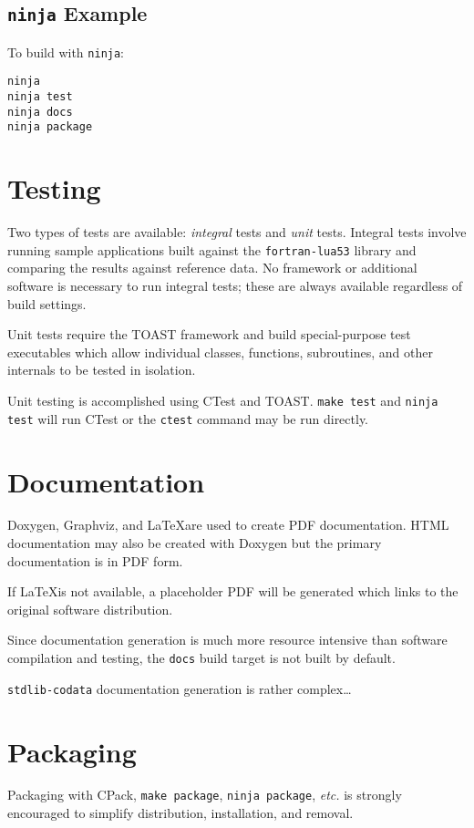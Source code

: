 \subsection{\texttt{ninja} Example}

To build with \texttt{ninja}:

\begin{Verbatim}
ninja
ninja test
ninja docs
ninja package
\end{Verbatim}

\section{Testing}

Two types of tests are available: \emph{integral} tests and \emph{unit}
tests. Integral tests involve running sample applications built against the
\texttt{fortran-lua53} library and comparing the results against reference data.
No framework or additional software is necessary to run integral tests;
these are always available regardless of build settings.

Unit tests require the TOAST framework and build special-purpose test
executables which allow individual classes, functions, subroutines, and
other internals to be tested in isolation.

Unit testing is accomplished using CTest and TOAST. \texttt{make test} and
\texttt{ninja test} will run CTest or the \texttt{ctest} command may be
run directly.


\section{Documentation}

Doxygen, Graphviz, and \LaTeX are used to create PDF
documentation. HTML documentation may also be created with Doxygen but
the primary documentation is in PDF form.

If \LaTeX is not available, a placeholder PDF will be generated which
links to the original software distribution.

Since documentation generation is much more resource intensive than
software compilation and testing, the \texttt{docs} build target is
not built by default.

\texttt{stdlib-codata} documentation generation is rather complex\ldots

\section{Packaging}

Packaging with CPack, \texttt{make package}, \texttt{ninja package},
\textit{etc.} is strongly encouraged to simplify distribution,
installation, and removal.
